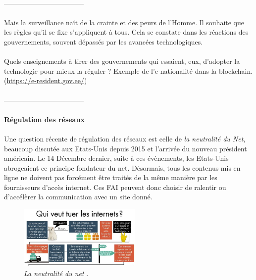 \paragraph{} -----------------------------------

\paragraph{} Mais la surveillance naît de la crainte et des peurs de l'Homme. 
Il souhaite que les règles qu'il se fixe s'appliquent à tous. Cela se constate
dans les réactions des gouvernements, souvent dépassés par les avancées technologiques.

\paragraph{} Quels enseignements à tirer des gouvernements qui essaient, eux, 
d'adopter la technologie pour mieux la réguler ? Exemple de l'e-nationalité
dans la blockchain. (\url{https://e-resident.gov.ee/})

\paragraph{} -----------------------------------

\paragraph{Régulation des réseaux}

\paragraph{} Une question récente de régulation des réseaux est celle de \emph{la neutralité du Net},
beaucoup discutée aux Etats-Unis depuis 2015 et l'arrivée du nouveau président américain. Le 14 Décembre
dernier, suite à ces évènements, les Etats-Unis abrogeaient ce principe fondateur du net. \cite{NetNeutrality0}
Désormais, tous les contenus mis en ligne ne doivent pas forcément être traités de la même manière par
les fournisseurs d'accès internet. Ces FAI peuvent donc choisir de ralentir ou d'accélèrer la communication
avec un site donné.

\begin{figure}[ht]
    \centering
    \includegraphics[width=225px]{chapters/02/images/internet_cats.jpg}
    \caption{\label{netneutrality}\emph{La neutralité du net} \cite{NetNeutrality1}.}
\end{figure}

